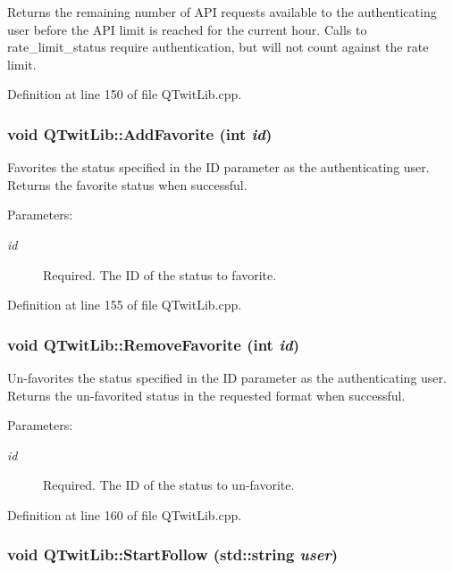 Returns the remaining number of API requests available to the authenticating user before the API limit is reached for the current hour. Calls to rate\_\-limit\_\-status require authentication, but will not count against the rate limit. 

Definition at line 150 of file QTwitLib.cpp.\hypertarget{classQTwitLib_0021eb836ece32c14cbe01d66bc8c79a}{
\subsubsection{\setlength{\rightskip}{0pt plus 5cm}void QTwitLib::AddFavorite (int {\em id})}}
\label{classQTwitLib_0021eb836ece32c14cbe01d66bc8c79a}


Favorites the status specified in the ID parameter as the authenticating user. Returns the favorite status when successful. \begin{Desc}
\item[Parameters:]
\begin{description}
\item[{\em id}]Required. The ID of the status to favorite. \end{description}
\end{Desc}


Definition at line 155 of file QTwitLib.cpp.\hypertarget{classQTwitLib_efabe0560a2117e232d48cc536d67e0e}{
\subsubsection{\setlength{\rightskip}{0pt plus 5cm}void QTwitLib::RemoveFavorite (int {\em id})}}
\label{classQTwitLib_efabe0560a2117e232d48cc536d67e0e}


Un-favorites the status specified in the ID parameter as the authenticating user. Returns the un-favorited status in the requested format when successful. \begin{Desc}
\item[Parameters:]
\begin{description}
\item[{\em id}]Required. The ID of the status to un-favorite. \end{description}
\end{Desc}


Definition at line 160 of file QTwitLib.cpp.\hypertarget{classQTwitLib_a8195413e39929fd57e475db2d0ce193}{
\subsubsection{\setlength{\rightskip}{0pt plus 5cm}void QTwitLib::StartFollow (std::string {\em user})}}
\label{classQTwitLib_a8195413e39929fd57e475db2d0ce193}



